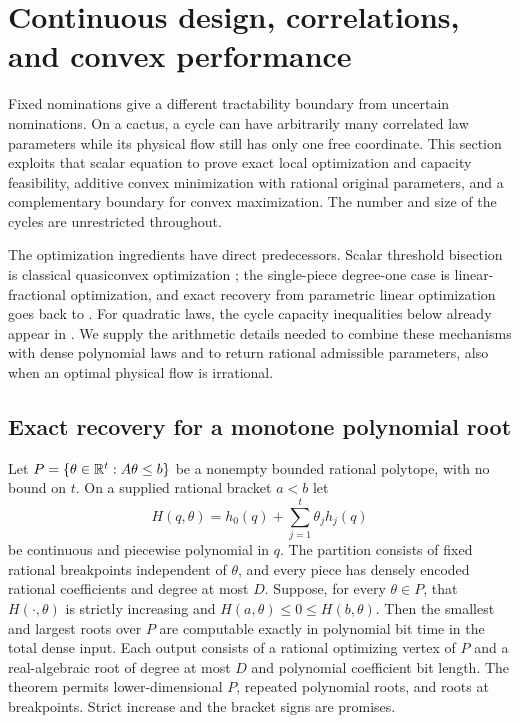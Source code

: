 \section{Continuous design, correlations, and convex performance}
\label{sec:a-design}

Fixed nominations give a different tractability boundary from uncertain
nominations.  On a cactus, a cycle can have arbitrarily many
correlated law parameters while its physical flow still has only one
free coordinate.  This section exploits that scalar equation to prove
exact local optimization and capacity feasibility, additive convex
minimization with rational original parameters, and a complementary
boundary for convex maximization.  The number and size of the cycles are
unrestricted throughout.

The optimization ingredients have direct predecessors.  Scalar threshold
bisection is classical quasiconvex optimization
\citep[Sections 2.1 and 3]{agrawal2020-dqcp}; the single-piece degree-one case is
linear-fractional optimization, and exact recovery from parametric linear
optimization goes back to \citet[Section 2]{megiddo1979-rational}.
For quadratic laws, the cycle capacity inequalities below already appear
in \citet[Proposition 4.9, Lemma 4.10, and Proposition 4.11]
{amann2018-deciding-robust-feasibility-and-infeasibility}.
We supply the arithmetic details needed to combine these mechanisms with
dense polynomial laws and to return rational admissible parameters,
also when an optimal physical flow is irrational.

\subsection{Exact recovery for a monotone polynomial root}

\begin{theorem}
\label{thm:a-design-root}
Let $P=\{\theta\in\mathbb{R}^t:A\theta\le b\}$ be a nonempty bounded rational
polytope, with no bound on $t$.  On a supplied rational bracket $a<b$ let
\[
 H(q,\theta)=h_0(q)+\sum_{j=1}^t\theta_jh_j(q)
\]
be continuous and piecewise polynomial in $q$.  The partition consists
of fixed rational breakpoints independent of $\theta$, and every piece
has densely encoded rational coefficients and degree at most $D$.
Suppose, for every $\theta\in P$, that $H(\cdot,\theta)$ is strictly
increasing and $H(a,\theta)\le0\le H(b,\theta)$.
Then the smallest and largest roots over $P$ are computable exactly in
polynomial bit time in the total dense input.  Each output consists of a
rational optimizing vertex of $P$ and a real-algebraic root of degree at
most $D$ and polynomial coefficient bit length.  The theorem permits
lower-dimensional $P$, repeated polynomial roots, and roots at
breakpoints.  Strict increase and the bracket signs are promises.
\end{theorem}

